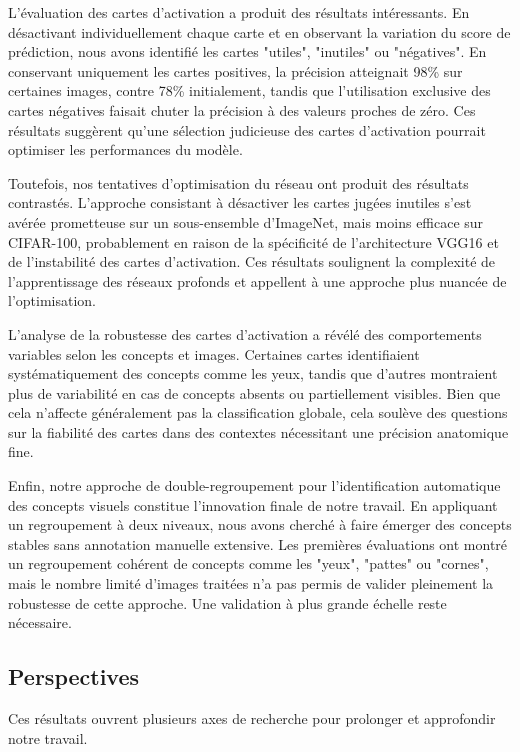 \documentclass[runningheads]{llncs}
\begin{document}
L'évaluation des cartes d'activation a produit des résultats intéressants. En désactivant individuellement chaque carte et en observant la variation du score de prédiction, nous avons identifié les cartes "utiles", "inutiles" ou "négatives". En conservant uniquement les cartes positives, la précision atteignait 98\% sur certaines images, contre 78\% initialement, tandis que l'utilisation exclusive des cartes négatives faisait chuter la précision à des valeurs proches de zéro. Ces résultats suggèrent qu'une sélection judicieuse des cartes d'activation pourrait optimiser les performances du modèle.

Toutefois, nos tentatives d'optimisation du réseau ont produit des résultats contrastés. L'approche consistant à désactiver les cartes jugées inutiles s'est avérée prometteuse sur un sous-ensemble d'ImageNet, mais moins efficace sur CIFAR-100, probablement en raison de la spécificité de l'architecture VGG16 et de l'instabilité des cartes d'activation. Ces résultats soulignent la complexité de l'apprentissage des réseaux profonds et appellent à une approche plus nuancée de l'optimisation.

L'analyse de la robustesse des cartes d'activation a révélé des comportements variables selon les concepts et images. Certaines cartes identifiaient systématiquement des concepts comme les yeux, tandis que d'autres montraient plus de variabilité en cas de concepts absents ou partiellement visibles. Bien que cela n'affecte généralement pas la classification globale, cela soulève des questions sur la fiabilité des cartes dans des contextes nécessitant une précision anatomique fine.

Enfin, notre approche de double-regroupement pour l'identification automatique des concepts visuels constitue l'innovation finale de notre travail. En appliquant un regroupement à deux niveaux, nous avons cherché à faire émerger des concepts stables sans annotation manuelle extensive. Les premières évaluations ont montré un regroupement cohérent de concepts comme les "yeux", "pattes" ou "cornes", mais le nombre limité d'images traitées n'a pas permis de valider pleinement la robustesse de cette approche. Une validation à plus grande échelle reste nécessaire.

\subsection{Perspectives}

Ces résultats ouvrent plusieurs axes de recherche pour prolonger et approfondir notre travail.
\end{document}
